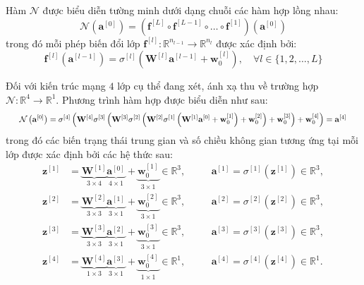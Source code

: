 Hàm $\mathcal{N}$ được biểu diễn tường minh dưới dạng chuỗi các hàm hợp lồng nhau:
\begin{equation}
    \mathcal{N}(\mathbf{a}^{[0]}) = (\mathbf{f}^{[L]} \circ \mathbf{f}^{[L-1]} \circ \dots \circ \mathbf{f}^{[1]})(\mathbf{a}^{[0]})
\end{equation}
trong đó mỗi phép biến đổi lớp $\mathbf{f}^{[l]}: \mathbb{R}^{n_{l-1}} \to \mathbb{R}^{n_l}$ được xác định bởi:
\begin{equation}
    \mathbf{f}^{[l]}(\mathbf{a}^{[l-1]}) = \sigma^{[l]}\left(\mathbf{W}^{[l]} \mathbf{a}^{[l-1]} + \mathbf{w}_0^{[l]}\right), \quad \forall l \in \{1, 2, \dots, L\}
\end{equation}

Đối với kiến trúc mạng $4$ lớp cụ thể đang xét, ánh xạ thu về trường hợp $\mathcal{N}: \mathbb{R}^4 \to \mathbb{R}^1$. Phương trình hàm hợp được biểu diễn như sau:
\begin{equation}
\resizebox{0.96\linewidth}{!}{$
    \mathcal{N}\left(\mathbf{a}^{[0]}\right) = \sigma^{[4]} \left( \mathbf{W}^{[4]} \sigma^{[3]} \left( \mathbf{W}^{[3]} \sigma^{[2]} \left( \mathbf{W}^{[2]} \sigma^{[1]} \left( \mathbf{W}^{[1]} \mathbf{a}^{[0]} + \mathbf{w}_0^{[1]} \right) + \mathbf{w}_0^{[2]} \right) + \mathbf{w}_0^{[3]} \right) + \mathbf{w}_0^{[4]} \right) = \mathbf{a}^{[4]}
$}
\end{equation}
trong đó các biến trạng thái trung gian và số chiều không gian tương ứng tại mỗi lớp được xác định bởi các hệ thức sau:
\begin{align}
    \mathbf{z}^{[1]} &= \underbrace{\mathbf{W}^{[1]}}_{3 \times 4} \underbrace{\mathbf{a}^{[0]}}_{4 \times 1} + \underbrace{\mathbf{w}_0^{[1]}}_{3 \times 1} \in \mathbb{R}^3, \quad 
    &&\mathbf{a}^{[1]} = \sigma^{[1]}\left(\mathbf{z}^{[1]}\right) \in \mathbb{R}^3, \\
    \mathbf{z}^{[2]} &= \underbrace{\mathbf{W}^{[2]}}_{3 \times 3} \underbrace{\mathbf{a}^{[1]}}_{3 \times 1} + \underbrace{\mathbf{w}_0^{[2]}}_{3 \times 1} \in \mathbb{R}^3, \quad 
    &&\mathbf{a}^{[2]} = \sigma^{[2]}\left(\mathbf{z}^{[2]}\right) \in \mathbb{R}^3, \\
    \mathbf{z}^{[3]} &= \underbrace{\mathbf{W}^{[3]}}_{3 \times 3} \underbrace{\mathbf{a}^{[2]}}_{3 \times 1} + \underbrace{\mathbf{w}_0^{[3]}}_{3 \times 1} \in \mathbb{R}^3, \quad 
    &&\mathbf{a}^{[3]} = \sigma^{[3]}\left(\mathbf{z}^{[3]}\right) \in \mathbb{R}^3, \\
    \mathbf{z}^{[4]} &= \underbrace{\mathbf{W}^{[4]}}_{1 \times 3} \underbrace{\mathbf{a}^{[3]}}_{3 \times 1} + \underbrace{\mathbf{w}_0^{[4]}}_{1 \times 1} \in \mathbb{R}^1, \quad 
    &&\mathbf{a}^{[4]} = \sigma^{[4]}\left(\mathbf{z}^{[4]}\right) \in \mathbb{R}^1.
\end{align}

